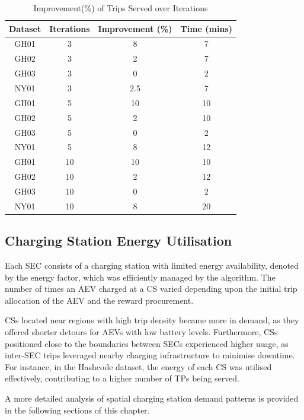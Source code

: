 \begin{table}[htbp]
\caption{Improvement(\%) of Trips Served over Iterations}
\begin{center}
\begin{tabular}{|c|c|c|c|}
\hline
\textbf{Dataset} & \textbf{ Iterations} & \textbf{Improvement (\%)} & \textbf{Time (mins)} \\
\hline
GH01 & 3 & 8 & 7 \\
GH02 & 3 & 2 & 7 \\
GH03 & 3 & 0 & 2 \\
NY01 & 3 & 2.5 & 7 \\
GH01 & 5 & 10 & 10 \\
GH02 & 5 & 2 & 10 \\
GH03 & 5 & 0 & 2 \\
NY01 & 5 & 8 & 12 \\
GH01 & 10 & 10 & 10 \\
GH02 & 10 & 2 & 12 \\
GH03 & 10 & 0 & 2 \\
NY01 & 10 & 8 & 20 \\
\hline
\end{tabular}
\label{tab:trip_satisfaction}
\end{center}
\end{table}



\subsection{Charging Station Energy Utilisation}
Each SEC consists of a charging station with limited energy availability, denoted by the energy factor, which was efficiently managed by the algorithm. The number of times an AEV charged at a CS varied depending upon the initial trip allocation of the AEV and the reward procurement. 

CSs located near regions with high trip density became more in demand, as they offered shorter detours for AEVs with low battery levels. Furthermore, CSs positioned close to the boundaries between SECs experienced higher usage, as inter-SEC trips leveraged nearby charging infrastructure to minimise downtime. For instance, in the Hashcode dataset, the energy of each CS was utilised effectively, contributing to a higher number of TPs being served.

A more detailed analysis of spatial charging station demand patterns is provided in the following sections of this chapter.

